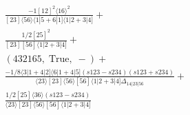 \documentclass[varwidth, border=5pt]{standalone}
\begin{document}
\begin{my}
$\begin{gathered}
\scriptscriptstyle\frac{-1[12]^2⟨16⟩^2}{[23]⟨56⟩⟨1|5+6|1]⟨1|2+3|4]}+\\
\scriptscriptstyle\frac{1/2[25]^2}{[23][56]⟨1|2+3|4]}+\\
\scriptscriptstyle(432165,\;\text{True},\;-)+\\
\scriptscriptstyle\frac{-1/8⟨3|1+4|2]⟨6|1+4|5]\scriptscriptstyle(s123-s234)(s123+s234)}{⟨23⟩[23]⟨56⟩[56]⟨1|2+3|4]Δ_{14|23|56}}+\\
\scriptscriptstyle\frac{1/2[25]⟨36⟩\scriptscriptstyle(s123-s234)}{⟨23⟩[23]⟨56⟩[56]⟨1|2+3|4]}\phantom{+}
\end{gathered}$
\end{my}
\end{document}
